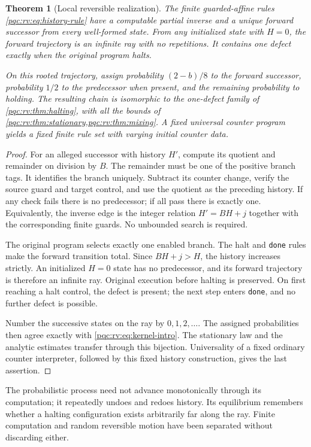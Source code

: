 \documentclass[11pt,letterpaper]{article}
\numberwithin{equation}{section}
\newtheorem{theorem}{Theorem}[section]
\theoremstyle{definition}
\theoremstyle{remark}
\newcommand{\code}[1]{\nolinkurl{#1}}
\begin{document}
\begin{theorem}[Local reversible realization]\label{pqc:rv:thm:counter}
The finite guarded-affine rules \cref{pqc:rv:eq:history-rule} have a
computable partial inverse and a unique forward successor from every
well-formed state. From any initialized state with $H=0$, the forward
trajectory is an infinite ray with no repetitions. It contains one
defect exactly when the original program halts.

On this rooted trajectory, assign probability $(2-b)/8$ to the
forward successor, probability $1/2$ to the predecessor when present,
and the remaining probability to holding. The resulting chain is
isomorphic to the one-defect family of \cref{pqc:rv:thm:halting}, with all
the bounds of \cref{pqc:rv:thm:stationary,pqc:rv:thm:mixing}. A fixed universal
counter program yields a fixed finite rule set with varying initial
counter data.
\end{theorem}
\begin{proof}
For an alleged successor with history $H'$, compute its quotient and
remainder on division by $B$. The remainder must be one of the
positive branch tags. It identifies the branch uniquely. Subtract
its counter change, verify the source guard and target control, and
use the quotient as the preceding history. If any check fails there
is no predecessor; if all pass there is exactly one. Equivalently,
the inverse edge is the integer relation $H'=BH+j$ together with the
corresponding finite guards. No unbounded search is required.

The original program selects exactly one enabled branch. The halt
and \code{done} rules make the forward transition total. Since
$BH+j>H$, the history increases strictly. An initialized $H=0$
state has no predecessor, and its forward trajectory is therefore
an infinite ray. Original execution before halting is preserved.
On first reaching a halt control, the defect is present; the next
step enters \code{done}, and no further defect is possible.

Number the successive states on the ray by $0,1,2,\ldots$. The
assigned probabilities then agree exactly with \cref{pqc:rv:eq:kernel-intro}.
The stationary law and the analytic estimates transfer through this
bijection. Universality of a fixed ordinary counter interpreter,
followed by this fixed history construction, gives the last assertion.
\end{proof}

The probabilistic process need not advance monotonically through its
computation; it repeatedly undoes and redoes history. Its equilibrium
remembers whether a halting configuration exists arbitrarily far
along the ray. Finite computation and random reversible motion have
been separated without discarding either.
\end{document}
